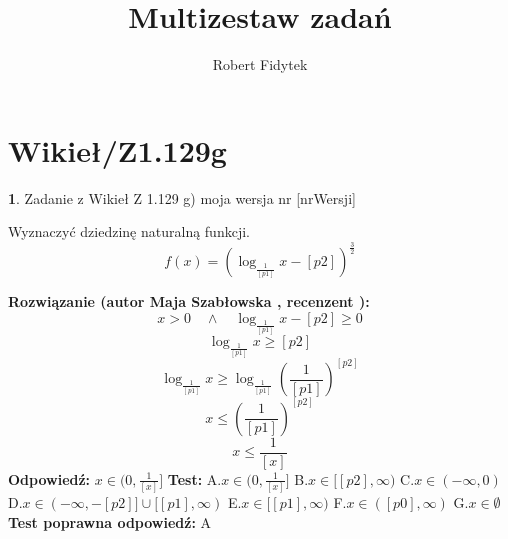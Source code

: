 \documentclass[12pt, a4paper]{article}
\title{Multizestaw zadań}
\author{Robert Fidytek}
\date{}
\theoremstyle{definition} %
\newtheorem{zad}{}
\newcommand{\kategoria}[1]{\section{#1}} %
\newcommand{\zadStart}[1]{\begin{zad}#1\newline} %
\newcommand{\zadStop}{\end{zad}}   %
\newcommand{\rozwStart}[2]{\noindent \textbf{Rozwiązanie (autor #1 , recenzent #2): }\newline} %
\newcommand{\rozwStop}{\newline}                                            %
\newcommand{\odpStart}{\noindent \textbf{Odpowiedź:}\newline}    %
\newcommand{\odpStop}{\newline}                                             %
\newcommand{\testStart}{\noindent \textbf{Test:}\newline} %
\newcommand{\testStop}{\newline} %
\newcommand{\kluczStart}{\noindent \textbf{Test poprawna odpowiedź:}\newline} %
\newcommand{\kluczStop}{\newline} %
\begin{document}
\maketitle


\kategoria{Wikieł/Z1.129g}
\zadStart{Zadanie z Wikieł Z 1.129 g) moja wersja nr [nrWersji]}

Wyznaczyć dziedzinę naturalną funkcji.
$$f(x)=(\log_{\frac{1}{[p1]}}x-[p2])^{\frac{3}{2}}$$

\zadStop

\rozwStart{Maja Szabłowska}{}
$$x>0 \quad \land \quad \log_{\frac{1}{[p1]}}x-[p2]\geq 0$$
$$\log_{\frac{1}{[p1]}}x\geq [p2]$$
$$\log_{\frac{1}{[p1]}}x\geq \log_{\frac{1}{[p1]}}\left(\frac{1}{[p1]}\right)^{[p2]}$$
$$x\leq\left(\frac{1}{[p1]}\right)^{[p2]} $$
$$x\leq \frac{1}{[x]}$$
\rozwStop
\odpStart
$x\in(0,\frac{1}{[x]}]$
\odpStop
\testStart
A.$x\in(0,\frac{1}{[x]}]$
B.$x\in[[p2],\infty)$
C.$x\in(-\infty, 0)$
D.$x\in(-\infty, -[p2]] \cup [[p1],\infty)$
E.$x\in[[p1],\infty)$
F.$x\in([p0],\infty)$
G.$x\in\emptyset$
\testStop
\kluczStart
A
\kluczStop
\end{document}
